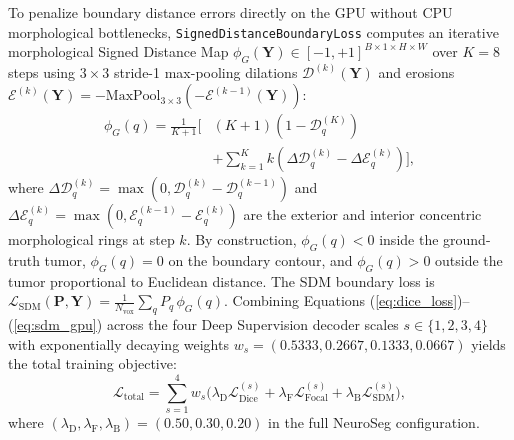 \documentclass[journal,onecolumn,10pt]{IEEEtran}
\begin{document}
To penalize boundary distance errors directly on the GPU without CPU morphological bottlenecks, \texttt{SignedDistanceBoundaryLoss} computes an iterative morphological Signed Distance Map $\phi_G(\mathbf{Y}) \in [-1, +1]^{B \times 1 \times H \times W}$ over $K = 8$ steps using $3\times 3$ stride-1 max-pooling dilations $\mathcal{D}^{(k)}(\mathbf{Y})$ and erosions $\mathcal{E}^{(k)}(\mathbf{Y}) = -\text{MaxPool}_{3\times 3}(-\mathcal{E}^{(k-1)}(\mathbf{Y}))$:
\begin{equation}
\begin{aligned}
    \phi_G(q) = \frac{1}{K+1}\Bigg[&(K+1)\!\left(1 - \mathcal{D}^{(K)}_q\right) \\
    &+ \sum_{k=1}^{K} k\!\left(\Delta\mathcal{D}^{(k)}_q - \Delta\mathcal{E}^{(k)}_q\right)\Bigg],
\end{aligned}
    \label{eq:sdm_gpu}
\end{equation}
where $\Delta\mathcal{D}^{(k)}_q = \max(0, \mathcal{D}^{(k)}_q - \mathcal{D}^{(k-1)}_q)$ and $\Delta\mathcal{E}^{(k)}_q = \max(0, \mathcal{E}^{(k-1)}_q - \mathcal{E}^{(k)}_q)$ are the exterior and interior concentric morphological rings at step $k$. By construction, $\phi_G(q) < 0$ inside the ground-truth tumor, $\phi_G(q) = 0$ on the boundary contour, and $\phi_G(q) > 0$ outside the tumor proportional to Euclidean distance. The SDM boundary loss is $\mathcal{L}_{\text{SDM}}(\mathbf{P},\mathbf{Y}) = \frac{1}{N_{\text{vox}}}\sum_q P_q\,\phi_G(q)$. Combining Equations (\ref{eq:dice_loss})--(\ref{eq:sdm_gpu}) across the four Deep Supervision decoder scales $s \in \{1, 2, 3, 4\}$ with exponentially decaying weights $w_s = (0.5333, 0.2667, 0.1333, 0.0667)$ yields the total training objective:
\begin{equation}
    \mathcal{L}_{\text{total}} = \sum_{s=1}^{4} w_s \Big( \lambda_{\text{D}}\mathcal{L}_{\text{Dice}}^{(s)} + \lambda_{\text{F}}\mathcal{L}_{\text{Focal}}^{(s)} + \lambda_{\text{B}}\mathcal{L}_{\text{SDM}}^{(s)} \Big),
    \label{eq:total_loss}
\end{equation}
where $(\lambda_{\text{D}}, \lambda_{\text{F}}, \lambda_{\text{B}}) = (0.50, 0.30, 0.20)$ in the full NeuroSeg configuration.
\end{document}
